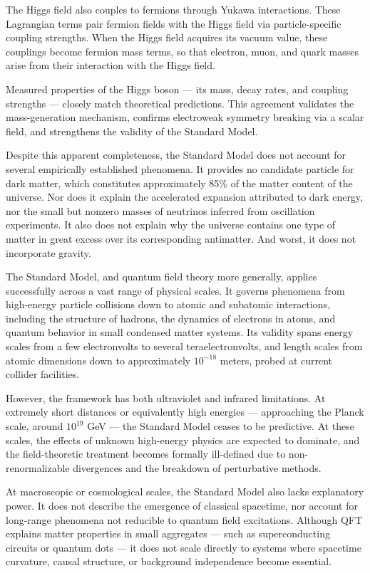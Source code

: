 The Higgs field also couples to fermions through Yukawa interactions. These Lagrangian terms pair fermion fields with the Higgs field via particle-specific coupling strengths. When the Higgs field acquires its vacuum value, these couplings become fermion mass terms, so that electron, muon, and quark masses arise from their interaction with the Higgs field.

Measured properties of the Higgs boson — its mass, decay rates, and coupling strengths — closely match theoretical predictions. This agreement validates the mass-generation mechanism, confirms electroweak symmetry breaking via a scalar field, and strengthens the validity of the Standard Model.

Despite this apparent completeness, the Standard Model does not account for several empirically established phenomena. It provides no candidate particle for dark matter, which constitutes approximately 85\% of the matter content of the universe. Nor does it explain the accelerated expansion attributed to dark energy, nor the small but nonzero masses of neutrinos inferred from oscillation experiments. It also does not explain why the universe contains one type of matter in great excess over its corresponding antimatter. And worst, it does not incorporate gravity.

The Standard Model, and quantum field theory more generally, applies successfully across a vast range of physical scales. It governs phenomena from high-energy particle collisions down to atomic and subatomic interactions, including the structure of hadrons, the dynamics of electrons in atoms, and quantum behavior in small condensed matter systems. Its validity spans energy scales from a few electronvolts to several teraelectronvolts, and length scales from atomic dimensions down to approximately $10^{-18}$ meters, probed at current collider facilities.

However, the framework has both ultraviolet and infrared limitations. At extremely short distances or equivalently high energies — approaching the Planck scale, around $10^{19}$ GeV — the Standard Model ceases to be predictive. At these scales, the effects of unknown high-energy physics are expected to dominate, and the field-theoretic treatment becomes formally ill-defined due to non-renormalizable divergences and the breakdown of perturbative methods. 

At macroscopic or cosmological scales, the Standard Model also lacks explanatory power. It does not describe the emergence of classical spacetime, nor account for long-range phenomena not reducible to quantum field excitations. Although QFT explains matter properties in small aggregates — such as superconducting circuits or quantum dots — it does not scale directly to systems where spacetime curvature, causal structure, or background independence become essential.

